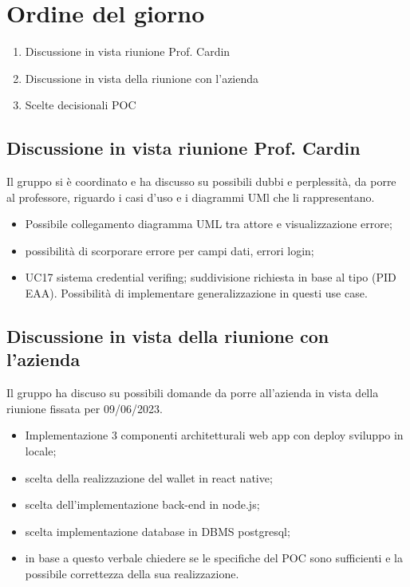 \section{Ordine del giorno}
\begin{enumerate}
\item Discussione in vista riunione Prof. Cardin
\item Discussione in vista della riunione con l'azienda 
\item Scelte decisionali POC
\end{enumerate}

\subsection{Discussione in vista riunione Prof. Cardin}
Il gruppo si è coordinato e ha discusso su possibili dubbi e perplessità, da porre al professore, riguardo i casi d'uso e i diagrammi UMl che li rappresentano.
\begin{itemize}
    \item Possibile collegamento diagramma UML tra attore e visualizzazione errore;
    \item possibilità di scorporare errore per campi dati, errori login;
    \item UC17 sistema credential verifing; suddivisione richiesta in base al tipo (PID EAA). Possibilità di implementare generalizzazione in questi use case.
\end{itemize}

\subsection{Discussione in vista della riunione con l'azienda}
Il gruppo ha discuso su possibili domande da porre all'azienda in vista della riunione fissata per 09/06/2023.
\begin{itemize}
\item Implementazione 3 componenti architetturali web app con deploy sviluppo in locale;
\item scelta della realizzazione del wallet in react native;
\item scelta dell'implementazione back-end in node.js;
\item scelta implementazione database in DBMS postgresql;
\item in base a questo verbale chiedere se le specifiche del POC sono sufficienti e la possibile correttezza della sua realizzazione.
\end{itemize}
